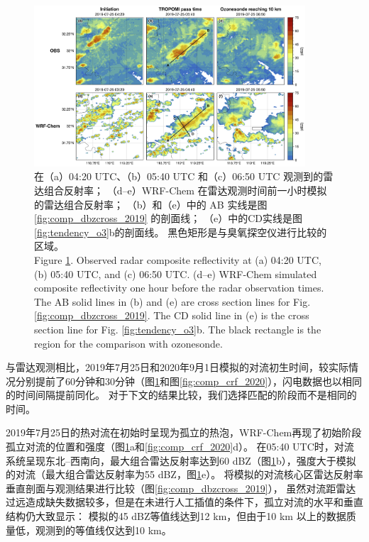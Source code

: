 \begin{figure}[H]
\centering
\includegraphics[width=0.9\textwidth]{./figures/comp_crf_2019.png}
\caption{在（a）04:20 UTC、（b）05:40 UTC 和（c）06:50 UTC 观测到的雷达组合反射率；
         （d--e）WRF-Chem 在雷达观测时间前一小时模拟的雷达组合反射率；
         （b）和（e）中的 AB 实线是图 \ref{fig:comp_dbzcross_2019} 的剖面线；
         （e）中的CD实线是图\ref{fig:tendency_o3}b的剖面线。
         黑色矩形是与臭氧探空仪进行比较的区域。\\
         Figure \ref{fig:comp_crf_2019}. Observed radar composite reflectivity at (a) 04:20 UTC, (b) 05:40 UTC, and (c) 06:50 UTC.
        (d--e) WRF-Chem simulated composite reflectivity one hour before the radar observation times.
        The AB solid lines in (b) and (e) are cross section lines for Fig. \ref{fig:comp_dbzcross_2019}.
        The CD solid line in (e) is the cross section line for Fig. \ref{fig:tendency_o3}b.
        The black rectangle is the region for the comparison with ozonesonde.}
\label{fig:comp_crf_2019}
\end{figure}


与雷达观测相比，2019年7月25日和2020年9月1日模拟的对流初生时间，较实际情况分别提前了60分钟和30分钟（图\ref{fig:comp_crf_2019}和图\ref{fig:comp_crf_2020}），闪电数据也以相同的时间间隔提前同化。
对于下文的结果比较，我们选择匹配的阶段而不是相同的时间。

2019年7月25日的热对流在初始时呈现为孤立的热泡，WRF-Chem再现了初始阶段孤立对流的位置和强度（图\ref{fig:comp_crf_2019}a和\ref{fig:comp_crf_2020}d）。
在05:40 UTC时，对流系统呈现东北--西南向，最大组合雷达反射率达到60 dBZ（图\ref{fig:comp_crf_2019}b），强度大于模拟的对流（最大组合雷达反射率为55 dBZ，图\ref{fig:comp_crf_2019}e）。
将模拟的对流核心区雷达反射率垂直剖面与观测结果进行比较（图\ref{fig:comp_dbzcross_2019}），
虽然对流距雷达过远造成缺失数据较多，但是在未进行人工插值的条件下，孤立对流的水平和垂直结构仍大致显示：
模拟的45 dBZ等值线达到12 km，但由于10 km 以上的数据质量低，观测到的等值线仅达到10 km。

